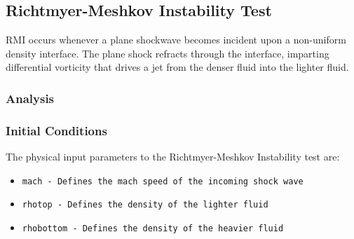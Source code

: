 

\subsection{Richtmyer-Meshkov Instability Test}

RMI occurs whenever a plane shockwave becomes incident upon a non-uniform density interface. 
The plane shock refracts through the interface, imparting differential vorticity that drives
a jet from the denser fluid into the lighter fluid.

\subsubsection{Analysis}

\subsubsection{Initial Conditions}


The physical input parameters to the Richtmyer-Meshkov Instability test are:
\begin{itemize}
\item \tt{mach} - Defines the mach speed of the incoming shock wave
\item \tt{rhotop} - Defines the density of the lighter fluid 
\item \tt{rhobottom} - Defines the density of the heavier fluid
\end{itemize}


